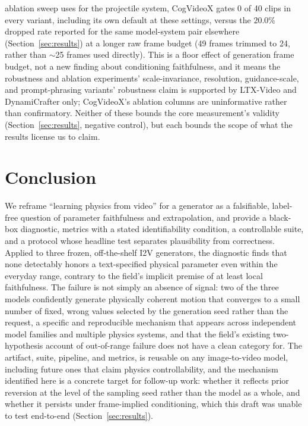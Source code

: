 \documentclass[10pt,twocolumn,letterpaper]{article}
\begin{document}
ablation sweep uses for the projectile system, CogVideoX gates 0 of 40
clips in every variant, including its own default at these settings, versus
the $20.0\%$ dropped rate reported for the same model-system pair
elsewhere (Section~\ref{sec:results}) at a longer raw frame budget (49
frames trimmed to 24, rather than $\sim$25 frames used directly). This is a
floor effect of generation frame budget, not a new finding about
conditioning faithfulness, and it means the robustness and ablation
experiments' scale-invariance, resolution, guidance-scale, and
prompt-phrasing variants' robustness claim is
supported by LTX-Video and DynamiCrafter only; CogVideoX's ablation columns
are uninformative rather than confirmatory. Neither of these bounds the
core measurement's validity (Section~\ref{sec:results}, negative control), but each
bounds the scope of what the results license us to claim.

\section{Conclusion}
We reframe ``learning physics from video'' for a generator as a falsifiable,
label-free question of parameter faithfulness and extrapolation, and provide a
black-box diagnostic, metrics with a stated identifiability condition, a
controllable suite, and a protocol whose headline test separates plausibility
from correctness. Applied to three frozen, off-the-shelf I2V generators, the
diagnostic finds that none detectably honors a text-specified physical
parameter even within the everyday range, contrary to the field's implicit
premise of at least local faithfulness. The failure is not simply an absence
of signal: two of the three models confidently generate physically coherent
motion that converges to a small number of fixed, wrong values selected by
the generation seed rather than the request, a specific and reproducible
mechanism that appears across independent model families and multiple
physics systems, and that the field's existing two-hypothesis account of
out-of-range failure does not have a clean category for. The artifact,
suite, pipeline, and metrics, is reusable on any image-to-video model,
including future ones that claim physics controllability, and the mechanism
identified here is a concrete target for follow-up work: whether it reflects
prior reversion at the level of the sampling seed rather than the model as a
whole, and whether it persists under frame-implied conditioning, which
this draft was unable to test end-to-end (Section~\ref{sec:results}).
\end{document}
